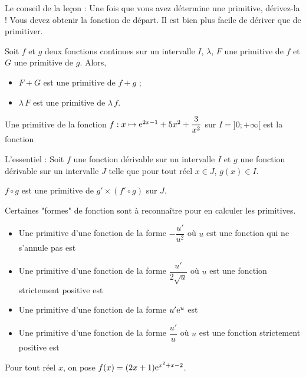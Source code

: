 \documentclass[11pt,fleqn, openany]{book} %
\begin{document}
Le conseil de la leçon : Une fois que vous avez détermine une primitive, dérivez-la ! Vous devez obtenir la fonction de départ. Il est bien plus facile de dériver que de primitiver.

\newpage
\begin{proposition}Soit $f$ et $g$ deux fonctions continues sur un intervalle $I$, $\lambda$, $F$ une primitive de $f$ et $G$ une primitive de $g$. Alors,
\begin{itemize}
\item $F+G$ est une primitive de $f+g$ ;
\item $\lambda\,F$ est une primitive de $\lambda\,f$.
\end{itemize}\end{proposition}

\begin{example}Une primitive de la fonction $f:x\mapsto \mathrm{e}^{2x-1}+5x^2+\dfrac{3}{x^2}$ sur $I=]0;+\infty[$ est la fonction
\vskip20pt\end{example}



\begin{proposition}L'essentiel : Soit $f$ une fonction dérivable sur un intervalle $I$ et $g$ une fonction dérivable sur un intervalle $J$ telle que pour tout réel $x\in J$, $g(x)\in I$.

$f \circ g$ est une primitive de $g' \times (f' \circ g)$ sur $J$.\end{proposition}

Certaines "formes" de fonction sont à reconnaître pour en calculer les primitives. 

\begin{itemize}
\item Une primitive d'une fonction de la forme $-\dfrac{u'}{u^2}$ où $u$ est une fonction qui ne s'annule pas est 
\vskip10pt
\item Une primitive d'une fonction de la forme $\dfrac{u'}{2\sqrt{u}}$ où $u$ est une fonction strictement positive est 
\vskip10pt
\item Une primitive d'une fonction de la forme $u'\mathrm{e}^u$ est 
\vskip10pt
\item Une primitive d'une fonction de la forme $\dfrac{u'}{u}$ où $u$ est une fonction strictement positive est 
\end{itemize}


\begin{example} Pour tout réel $x$, on pose $f(x)=(2x+1)\mathrm{e}^{x^2+x-2}$.

\vskip30pt
\end{example}
\end{document}

